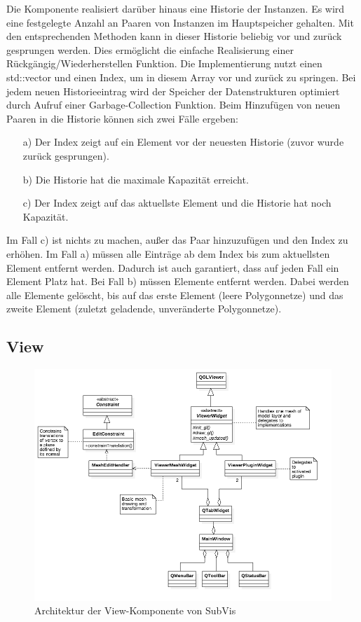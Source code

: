 Die Komponente realisiert darüber hinaus eine Historie der Instanzen.
Es wird eine festgelegte Anzahl an Paaren von Instanzen im Hauptspeicher gehalten.
Mit den entsprechenden Methoden kann in dieser Historie beliebig vor und zurück gesprungen werden.
Dies ermöglicht die einfache Realisierung einer Rückgängig/Wiederherstellen Funktion.
Die Implementierung nutzt einen std::vector und einen Index, um in diesem Array vor und zurück zu springen.
Bei jedem neuen Historieeintrag wird der Speicher der Datenstrukturen optimiert durch Aufruf einer Garbage-Collection Funktion.
Beim Hinzufügen von neuen Paaren in die Historie können sich zwei Fälle ergeben:

\begin{itemize}
\item[a)] Der Index zeigt auf ein Element vor der neuesten Historie (zuvor wurde zurück gesprungen).
\item[b)] Die Historie hat die maximale Kapazität erreicht.
\item[c)] Der Index zeigt auf das aktuellste Element und die Historie hat noch Kapazität.
\end{itemize}

Im Fall c) ist nichts zu machen, außer das Paar hinzuzufügen und den Index zu erhöhen.
Im Fall a) müssen alle Einträge ab dem Index bis zum aktuellsten Element entfernt werden. 
Dadurch ist auch garantiert, dass auf jeden Fall ein Element Platz hat.
Bei Fall b) müssen Elemente entfernt werden. 
Dabei werden alle Elemente gelöscht, bis auf das erste Element (leere Polygonnetze) und das zweite Element (zuletzt geladende, unveränderte Polygonnetze).
 

\subsection{View}

\begin{figure}
  \centering
  \includegraphics[width=\textwidth]{content/media/subvis_architektur_view.png}
  \caption{Architektur der View-Komponente von SubVis}
  \label{fig:subvis_architektur_view}
\end{figure}

